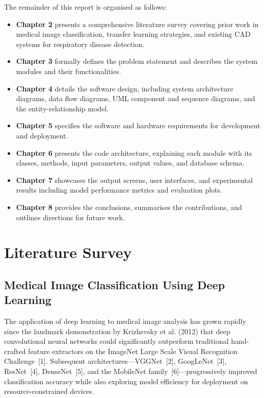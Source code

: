 \documentclass[12pt, a4paper, oneside]{report}
\begin{document}
The remainder of this report is organised as follows:

\begin{itemize}
    \item \textbf{Chapter 2} presents a comprehensive literature survey covering prior work in medical image classification, transfer learning strategies, and existing CAD systems for respiratory disease detection.
    \item \textbf{Chapter 3} formally defines the problem statement and describes the system modules and their functionalities.
    \item \textbf{Chapter 4} details the software design, including system architecture diagrams, data flow diagrams, UML component and sequence diagrams, and the entity-relationship model.
    \item \textbf{Chapter 5} specifies the software and hardware requirements for development and deployment.
    \item \textbf{Chapter 6} presents the code architecture, explaining each module with its classes, methods, input parameters, output values, and database schema.
    \item \textbf{Chapter 7} showcases the output screens, user interfaces, and experimental results including model performance metrics and evaluation plots.
    \item \textbf{Chapter 8} provides the conclusions, summarises the contributions, and outlines directions for future work.
\end{itemize}

\chapter{Literature Survey}
\label{chap:literature}

\section{Medical Image Classification Using Deep Learning}
\label{sec:medical_image_dl}

The application of deep learning to medical image analysis has grown rapidly since the landmark demonstration by Krizhevsky et al. (2012) that deep convolutional neural networks could significantly outperform traditional hand-crafted feature extractors on the ImageNet Large Scale Visual Recognition Challenge~[1]. Subsequent architectures---VGGNet~[2], GoogLeNet~[3], ResNet~[4], DenseNet~[5], and the MobileNet family~[6]---progressively improved classification accuracy while also exploring model efficiency for deployment on resource-constrained devices.
\end{document}

